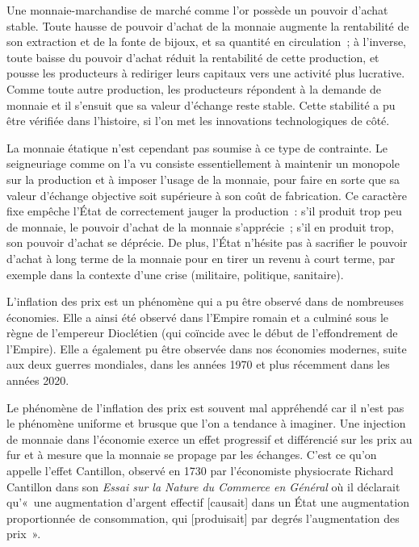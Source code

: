 Une monnaie-marchandise de marché comme l'or possède un pouvoir d'achat stable. Toute hausse de pouvoir d'achat de la monnaie augmente la rentabilité de son extraction et de la fonte de bijoux, et sa quantité en circulation~; à l'inverse, toute baisse du pouvoir d'achat réduit la rentabilité de cette production, et pousse les producteurs à rediriger leurs capitaux vers une activité plus lucrative. Comme toute autre production, les producteurs répondent à la demande de monnaie et il s'ensuit que sa valeur d'échange reste stable. Cette stabilité a pu être vérifiée dans l'histoire, si l'on met les innovations technologiques de côté.

La monnaie étatique n'est cependant pas soumise à ce type de contrainte. Le seigneuriage comme on l'a vu consiste essentiellement à maintenir un monopole sur la production et à imposer l'usage de la monnaie, pour faire en sorte que sa valeur d'échange objective soit supérieure à son coût de fabrication. Ce caractère fixe empêche l'État de correctement jauger la production~: s'il produit trop peu de monnaie, le pouvoir d'achat de la monnaie s'apprécie~; s'il en produit trop, son pouvoir d'achat se déprécie. De plus, l'État n'hésite pas à sacrifier le pouvoir d'achat à long terme de la monnaie pour en tirer un revenu à court terme, par exemple dans la contexte d'une crise (militaire, politique, sanitaire).

L'inflation des prix est un phénomène qui a pu être observé dans de nombreuses économies. Elle a ainsi été observé dans l'Empire romain et a culminé sous le règne de l'empereur Dioclétien (qui coïncide avec le début de l'effondrement de l'Empire). Elle a également pu être observée dans nos économies modernes, suite aux deux guerres mondiales, dans les années 1970 et plus récemment dans les années 2020.


Le phénomène de l'inflation des prix est souvent mal appréhendé car il n'est pas le phénomène uniforme et brusque que l'on a tendance à imaginer. Une injection de monnaie dans l'économie exerce un effet progressif et différencié sur les prix au fur et à mesure que la monnaie se propage par les échanges. C'est ce qu'on appelle l'effet Cantillon, observé en 1730 par l'économiste physiocrate Richard Cantillon dans son \emph{Essai sur la Nature du Commerce en Général} où il déclarait qu'«~une augmentation d'argent effectif [causait] dans un État une augmentation proportionnée de consommation, qui [produisait] par degrés l'augmentation des prix~». %

